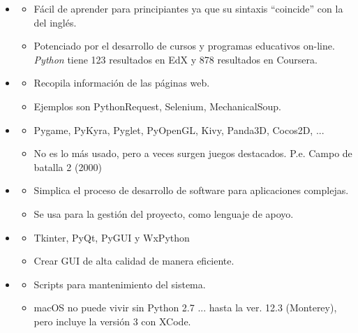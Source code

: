 \begin{itemize}

\item {}
\begin{itemize}
\item  Fácil de aprender para principiantes ya que su sintaxis ``coincide'' con la del inglés.
\item Potenciado por el desarrollo de cursos y programas educativos on-line.
 \textit{Python} tiene 123 resultados en EdX y 878 resultados en Coursera.
\end{itemize}

\item {}
\begin{itemize}
\item Recopila información de las páginas web.
\item Ejemplos son PythonRequest, Selenium, MechanicalSoup.
\end{itemize}

\item {}
\begin{itemize}
\item Pygame, PyKyra, Pyglet, PyOpenGL, Kivy, Panda3D, Cocos2D, ...
\item No es lo más usado, pero a veces surgen juegos destacados. P.e. Campo de batalla 2 (2000)
\end{itemize}


\item{}
\begin{itemize}
\item Simplica el proceso de desarrollo de software para aplicaciones complejas.
\item Se usa para la gestión del proyecto, como lenguaje de apoyo.
\end{itemize}

\item {}
\begin{itemize}
\item Tkinter, PyQt, PyGUI y WxPython
\item Crear GUI de alta calidad de manera eficiente.
\end{itemize}

\item {}
\begin{itemize}
\item Scripts para mantenimiento del sistema.
\item macOS no puede vivir sin Python 2.7 ... hasta la ver. 12.3 (Monterey), pero incluye la versión 3 con XCode.
\end{itemize}
\end{itemize}



